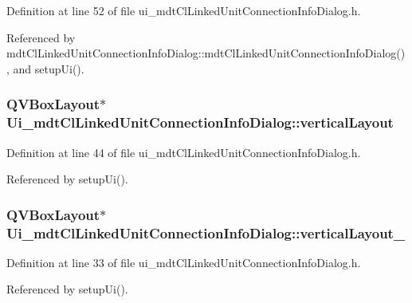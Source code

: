 Definition at line 52 of file ui\-\_\-mdt\-Cl\-Linked\-Unit\-Connection\-Info\-Dialog.\-h.



Referenced by mdt\-Cl\-Linked\-Unit\-Connection\-Info\-Dialog\-::mdt\-Cl\-Linked\-Unit\-Connection\-Info\-Dialog(), and setup\-Ui().

\hypertarget{class_ui__mdt_cl_linked_unit_connection_info_dialog_a2a3dc08abd1fcf94feb996ea00a7f3c2}{
\subsubsection[{vertical\-Layout}]{\setlength{\rightskip}{0pt plus 5cm}Q\-V\-Box\-Layout$\ast$ Ui\-\_\-mdt\-Cl\-Linked\-Unit\-Connection\-Info\-Dialog\-::vertical\-Layout}}\label{class_ui__mdt_cl_linked_unit_connection_info_dialog_a2a3dc08abd1fcf94feb996ea00a7f3c2}


Definition at line 44 of file ui\-\_\-mdt\-Cl\-Linked\-Unit\-Connection\-Info\-Dialog.\-h.



Referenced by setup\-Ui().

\hypertarget{class_ui__mdt_cl_linked_unit_connection_info_dialog_aeb6bef8b76b292ac59be916105d712cf}{
\subsubsection[{vertical\-Layout\-\_\-2}]{\setlength{\rightskip}{0pt plus 5cm}Q\-V\-Box\-Layout$\ast$ Ui\-\_\-mdt\-Cl\-Linked\-Unit\-Connection\-Info\-Dialog\-::vertical\-Layout\-\_}}\label{class_ui__mdt_cl_linked_unit_connection_info_dialog_aeb6bef8b76b292ac59be916105d712cf}


Definition at line 33 of file ui\-\_\-mdt\-Cl\-Linked\-Unit\-Connection\-Info\-Dialog.\-h.



Referenced by setup\-Ui().

